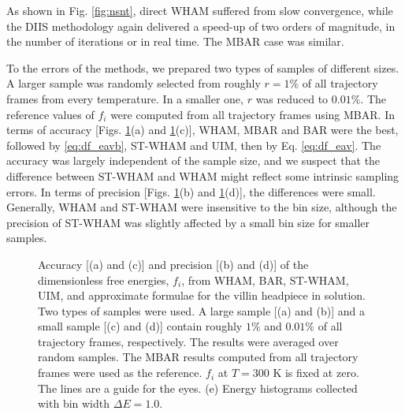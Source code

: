 \documentclass{gMOS2e}
\begin{document}
As shown in Fig. \ref{fig:nsnt},
direct WHAM suffered from slow convergence,
while the DIIS methodology again
delivered a speed-up of two orders of magnitude,
in the number of iterations or in real time.
%
The MBAR case was similar.
%



To  the errors of the methods,
we prepared two types of samples of different sizes.
%
A larger sample was randomly selected from roughly $r = 1\%$
of all trajectory frames from every temperature.
%
In a smaller one, $r$ was reduced to $0.01\%$.
%
The reference values of $f_i$
were computed from all trajectory frames using MBAR.
%
In terms of accuracy
[Figs. \ref{fig:whamcmp}(a) and \ref{fig:whamcmp}(c)],
WHAM, MBAR and BAR were the best,
followed by  \eqref{eq:df_eavb},
 ST-WHAM and UIM,
then by Eq. \eqref{eq:df_eav}.
%
The accuracy was largely independent of the sample size,
and we suspect that the difference
between ST-WHAM and WHAM
might reflect some intrinsic sampling errors.
%
%
In terms of precision
[Figs. \ref{fig:whamcmp}(b) and \ref{fig:whamcmp}(d)],
the differences were small.
%
%
Generally,
WHAM and ST-WHAM were insensitive to the bin size,
although the precision of ST-WHAM was slightly affected
by a small bin size for smaller samples.



\begin{figure}[h]
\begin{center}
  \caption{
    \label{fig:whamcmp}
    Accuracy [(a) and (c)] and precision [(b) and (d)] of
    the dimensionless free energies, $f_i$,
    from WHAM, BAR, ST-WHAM, UIM, and approximate formulae
    for the villin headpiece in solution.
    Two types of samples were used.
    A large sample [(a) and (b)]
    and
    a small sample [(c) and (d)]
    contain roughly
    $1\%$ and $0.01\%$ of all trajectory frames,
    respectively.
    The results were averaged over random samples.
    The MBAR results computed from all trajectory frames
    were used as the reference.
    $f_i$ at $T = 300$ K is fixed at zero.
    The lines are a guide for the eyes.
    (e) Energy histograms collected
    with bin width $\Delta E = 1.0$.
  }
\end{center}
\end{figure}
\end{document}
